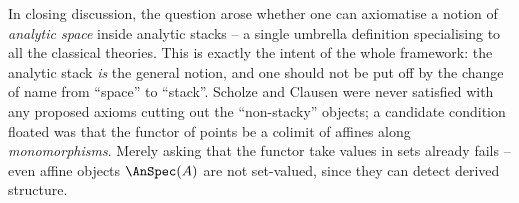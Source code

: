 \begin{remark}
\label{rmk:19:spaces-vs-stacks}
In closing discussion, the question arose whether one can axiomatise a notion of
\emph{analytic space} inside analytic stacks -- a single umbrella definition
specialising to all the classical theories. This is exactly the intent of the
whole framework: the analytic stack \emph{is} the general notion, and one should
not be put off by the change of name from ``space'' to ``stack''. Scholze and
Clausen were never satisfied with any proposed axioms cutting out the
``non-stacky'' objects; a candidate condition floated was that the functor of
points be a colimit of affines along \emph{monomorphisms}. Merely asking that the
functor take values in sets already fails -- even affine objects $\AnSpec(A)$ are
not set-valued, since they can detect derived structure.
\end{remark}
